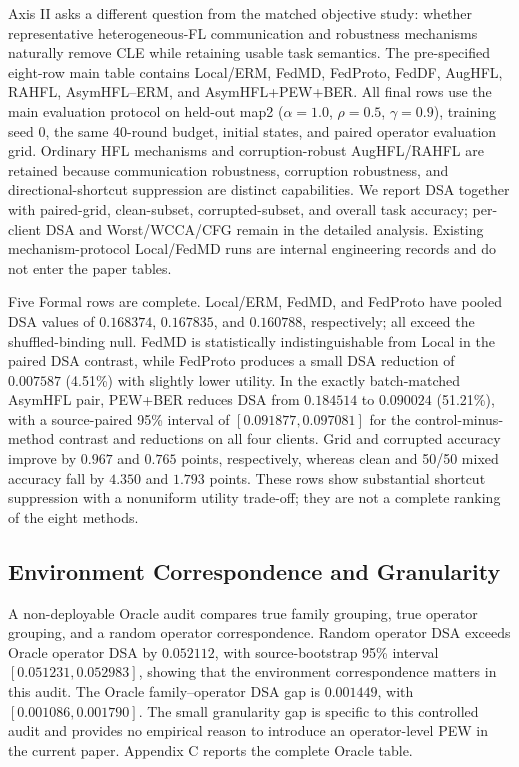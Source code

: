 Axis II asks a different question from the matched objective study: whether representative heterogeneous-FL communication and robustness mechanisms naturally remove CLE while retaining usable task semantics. The pre-specified eight-row main table contains Local/ERM, FedMD, FedProto, FedDF, AugHFL, RAHFL, AsymHFL--ERM, and AsymHFL+PEW+BER. All final rows use the main evaluation protocol on held-out map2 ($\alpha=1.0$, $\rho=0.5$, $\gamma=0.9$), training seed 0, the same 40-round budget, initial states, and paired operator evaluation grid. Ordinary HFL mechanisms and corruption-robust AugHFL/RAHFL are retained because communication robustness, corruption robustness, and directional-shortcut suppression are distinct capabilities. We report DSA together with paired-grid, clean-subset, corrupted-subset, and overall task accuracy; per-client DSA and Worst/WCCA/CFG remain in the detailed analysis. Existing mechanism-protocol Local/FedMD runs are internal engineering records and do not enter the paper tables.



Five Formal rows are complete. Local/ERM, FedMD, and FedProto have pooled DSA values of \(0.168374\), \(0.167835\), and \(0.160788\), respectively; all exceed the shuffled-binding null. FedMD is statistically indistinguishable from Local in the paired DSA contrast, while FedProto produces a small DSA reduction of \(0.007587\) (4.51\%) with slightly lower utility. In the exactly batch-matched AsymHFL pair, PEW+BER reduces DSA from \(0.184514\) to \(0.090024\) (51.21\%), with a source-paired 95\% interval of \([0.091877,0.097081]\) for the control-minus-method contrast and reductions on all four clients. Grid and corrupted accuracy improve by \(0.967\) and \(0.765\) points, respectively, whereas clean and 50/50 mixed accuracy fall by \(4.350\) and \(1.793\) points. These rows show substantial shortcut suppression with a nonuniform utility trade-off; they are not a complete ranking of the eight methods.


\subsection{Environment Correspondence and Granularity}

A non-deployable Oracle audit compares true family grouping, true operator grouping, and a random operator correspondence. Random operator DSA exceeds Oracle operator DSA by \(0.052112\), with source-bootstrap 95\% interval \([0.051231,0.052983]\), showing that the environment correspondence matters in this audit. The Oracle family--operator DSA gap is \(0.001449\), with \([0.001086,0.001790]\). The small granularity gap is specific to this controlled audit and provides no empirical reason to introduce an operator-level PEW in the current paper. Appendix C reports the complete Oracle table.

